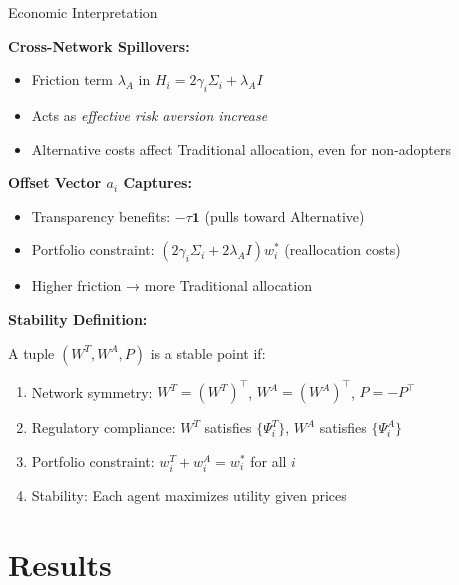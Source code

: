 \documentclass[aspectratio=169]{beamer}
\begin{document}
\begin{frame}{Economic Interpretation}
    
    \textbf{Cross-Network Spillovers:}
    \begin{itemize}
        \item Friction term $\lambda_A $ in $H_i = 2\gamma_i\Sigma_i + \lambda_A I$
        \item Acts as \textit{effective risk aversion increase}
        \item Alternative costs affect Traditional allocation, even for non-adopters
    \end{itemize}
    
    \vspace{0.3cm}
    \textbf{Offset Vector $a_i$ Captures:}
    \begin{itemize}
        \item Transparency benefits: $-\tau \mathbf{1}$ (pulls toward Alternative)
        \item Portfolio constraint: $(2\gamma_i\Sigma_i + 2\lambda_A I) w_i^*$ (reallocation costs)
        \item Higher friction → more Traditional allocation
    \end{itemize}
    
    \vspace{0.3cm}
    \textbf{Stability Definition:}
    
    A tuple $(W^T, W^A, P)$ is a stable point if:
    \begin{enumerate}
        \item Network symmetry: $W^T = (W^T)^\top$, $W^A = (W^A)^\top$, $P = -P^\top$
        \item Regulatory compliance: $W^T$ satisfies $\{\Psi_i^T\}$, $W^A$ satisfies $\{\Psi_i^A\}$
        \item Portfolio constraint: $w_i^T + w_i^A = w_i^*$ for all $i$
        \item Stability: Each agent maximizes utility given prices
    \end{enumerate}

\end{frame}

\section{Results}
\end{document}
